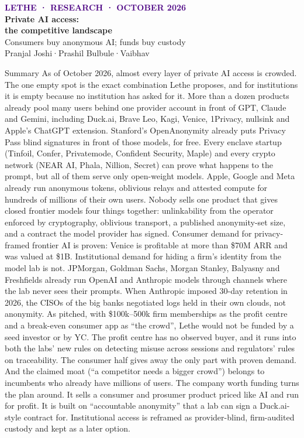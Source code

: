 \documentclass[10pt,a4paper]{article}
\newcommand{\eyebrow}[1]{{\fontsize{7}{9}\selectfont\bfseries\textcolor{indigo}{\MakeUppercase{#1}}}}
\begin{document}
\thispagestyle{fancy}
\vspace*{-3mm}
\eyebrow{Lethe · research · October 2026}\\[7pt]
{\fontsize{24}{28}\selectfont\bfseries\color{ink}Private AI access:\\ the competitive landscape}\\[4pt]
{\fontsize{14}{17}\selectfont\color{ink!80}Consumers buy anonymous AI; funds buy custody}\\[7pt]
{\fontsize{9}{11}\selectfont\color{ink!65}Pranjal Joshi\quad·\quad Prashil Bulbule\quad·\quad Vaibhav}
\vspace{3mm}

\begin{callout}{Summary}
As of October 2026, almost every layer of private AI access is crowded. The one empty spot is the exact combination Lethe proposes, and for institutions it is empty because no institution has asked for it. More than a dozen products already pool many users behind one provider account in front of GPT, Claude and Gemini, including Duck.ai, Brave Leo, Kagi, Venice, 1Privacy, nullsink and Apple's ChatGPT extension. Stanford's OpenAnonymity already puts Privacy Pass blind signatures in front of those models, for free. Every enclave startup (Tinfoil, Confer, Privatemode, Confident Security, Maple) and every crypto network (NEAR AI, Phala, Nillion, Secret) can prove what happens to the prompt, but all of them serve only open-weight models. Apple, Google and Meta already run anonymous tokens, oblivious relays and attested compute for hundreds of millions of their own users. Nobody sells one product that gives closed frontier models four things together: unlinkability from the operator enforced by cryptography, oblivious transport, a published anonymity-set size, and a contract the model provider has signed. Consumer demand for privacy-framed frontier AI is proven: Venice is profitable at more than \$70M ARR and was valued at \$1B. Institutional demand for hiding a firm's identity from the model lab is not. JPMorgan, Goldman Sachs, Morgan Stanley, Balyasny and Freshfields already run OpenAI and Anthropic models through channels where the lab never sees their prompts. When Anthropic imposed 30-day retention in 2026, the CISOs of the big banks negotiated logs held in their own clouds, not anonymity. As pitched, with \$100k--500k firm memberships as the profit centre and a break-even consumer app as ``the crowd'', Lethe would not be funded by a seed investor or by YC. The profit centre has no observed buyer, and it runs into both the labs' new rules on detecting misuse across sessions and regulators' rules on traceability. The consumer half gives away the only part with proven demand. And the claimed moat (``a competitor needs a bigger crowd'') belongs to incumbents who already have millions of users. The company worth funding turns the plan around. It sells a consumer and prosumer product priced like AI and run for profit. It is built on ``accountable anonymity'' that a lab can sign a Duck.ai-style contract for. Institutional access is reframed as provider-blind, firm-audited custody and kept as a later option.
\end{callout}
\end{document}

